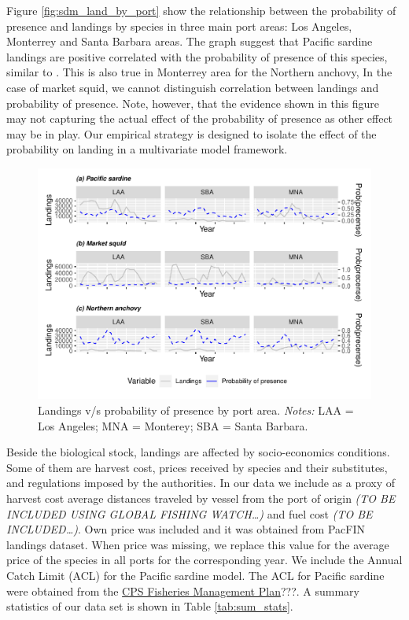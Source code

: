 Figure \ref{fig:sdm_land_by_port} show the relationship between the
probability of presence and landings by species in three main port
areas: Los Angeles, Monterrey and Santa Barbara areas. The graph suggest
that Pacific sardine landings are positive correlated with the
probability of presence of this species, similar to
\citet{smith2021potential}. This is also true in Monterrey area for the
Northern anchovy, In the case of market squid, we cannot distinguish
correlation between landings and probability of presence. Note, however,
that the evidence shown in this figure may not capturing the actual
effect of the probability of presence as other effect may be in play.
Our empirical strategy is designed to isolate the effect of the
probability on landing in a multivariate model framework.

\begin{Schunk}
\begin{figure}
\includegraphics{econ_landings_paper_files/figure-latex/SDM_land_by_port-1} \caption{Landings v/s probability of presence by port area. \textit{Notes:} LAA = Los Angeles; MNA = Monterey; SBA = Santa Barbara.\label{fig:sdm_land_by_port}}\label{fig:SDM_land_by_port}
\end{figure}
\end{Schunk}

Beside the biological stock, landings are affected by socio-economics
conditions. Some of them are harvest cost, prices received by species
and their substitutes, and regulations imposed by the authorities. In
our data we include as a proxy of harvest cost average distances
traveled by vessel from the port of origin \emph{(TO BE INCLUDED USING
GLOBAL FISHING WATCH\ldots)} and fuel cost \emph{(TO BE
INCLUDED\ldots)}. Own price was included and it was obtained from PacFIN
landings dataset. When price was missing, we replace this value for the
average price of the species in all ports for the corresponding year. We
include the Annual Catch Limit (ACL) for the Pacific sardine model. The
ACL for Pacific sardine were obtained from the \href{pcouncil.org}{CPS
Fisheries Management Plan}???. A summary statistics of our data set is
shown in Table \ref{tab:sum_stats}.

